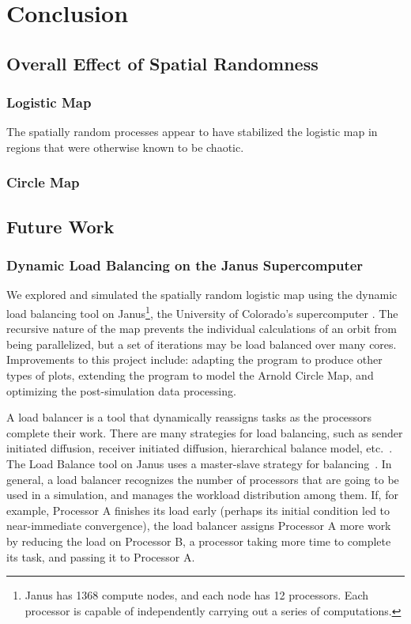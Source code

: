 \chapter{Conclusion}
\section{Overall Effect of Spatial Randomness}
\subsection{Logistic Map}
The spatially random processes appear to have stabilized the logistic
map in regions that were otherwise known to be chaotic.
\subsection{Circle Map}

\section{Future Work}
\subsection{Dynamic Load Balancing on the Janus Supercomputer}
We explored and simulated the spatially random logistic map using the
dynamic load balancing tool on Janus\footnote{Janus has 1368 compute nodes, and
  each node has 12 processors. Each processor is capable of
  independently carrying
  out a series of computations.}, the University of Colorado's supercomputer
\cite{janus}. The recursive nature of the map prevents the individual
calculations of an orbit from being parallelized, but a set of
iterations may be load balanced over many
cores. Improvements to this project include: adapting the program to
produce other types of plots, extending the program to model
the Arnold Circle Map, and optimizing the post-simulation data processing. 

A load balancer is a tool that dynamically reassigns tasks as the
processors complete their work. There are many strategies for load
balancing, such as sender initiated diffusion, receiver initiated
diffusion, hierarchical balance model, etc.~\cite{dlb}. The Load
Balance tool on Janus uses a master-slave strategy for
balancing~\cite{janus}. In general, a load balancer recognizes the
number of processors that are going to be used in a simulation, and manages
the workload distribution among them. If, for example, Processor A finishes its load early
(perhaps its initial condition led to near-immediate convergence),
the load balancer assigns Processor A more work by reducing the
load on Processor B, a processor taking more time to complete its
task, and passing it to Processor A.

